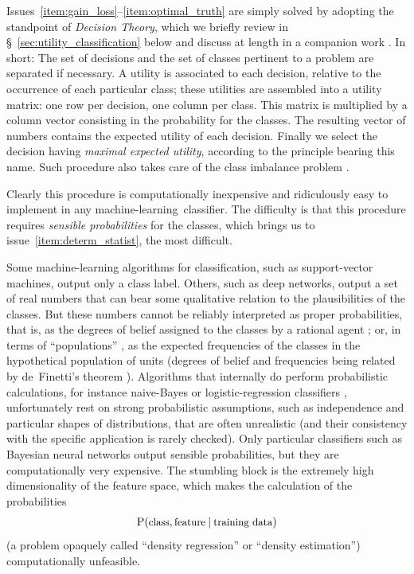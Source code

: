 \documentclass[\ifafour a4paper,12pt,\else a5paper,10pt,\fi%
onecolumn,oneside,article,%
british%
]{memoir}
\theoremstyle{remark}
\theoremstyle{innote}
\renewcommand*{\P}{\mathrm{P}}%
\renewcommand*{\|}[1][]{\nonscript\:#1\vert\nonscript\:\mathopen{}}
\newcommand*{\sect}{\S}%
\newcommand*{\sects}{\S\S}%
\newcommand*{\chap}{ch.}%
\newcommand*{\chaps}{chs}%
\newcommand*{\cf}{{cf.}}
\newcommand*{\texts}[1]{\text{\small #1}}
\newcommand*{\ml}{machine-learning}
\begin{document}
Issues~\ref{item:gain_loss}--\ref{item:optimal_truth} are simply solved by adopting the standpoint of \emph{Decision Theory}, which we briefly review in \sect~\ref{sec:utility_classification} below and discuss at length in a companion work \autocites{dyrlandetal2022}. In short: The set of decisions and the set of classes pertinent to a problem are separated if necessary. A utility is associated to each decision, relative to the occurrence of each particular class; these utilities are assembled into a utility matrix: one row per decision, one column per class. This matrix is multiplied by a column vector consisting in the probability for the classes. The resulting vector of numbers contains the expected utility of each decision. Finally we select the decision having \emph{maximal expected utility}, according to the principle bearing this name. Such procedure also takes care of the class imbalance problem \autocites[\cf\ the analysis by][(they use the term \enquote{cost} instead of \enquote{utility})]{drummondetal2005}.

Clearly this procedure is computationally inexpensive and ridiculously easy to implement in any \ml\ classifier. The difficulty is that this procedure requires \emph{sensible probabilities} \autocites[\enquote*{credibilities  would be agreed by all rational men if there were any rational men}][]{good1966} for the classes, which brings us to issue~\ref{item:determ_statist}, the most difficult.

Some machine-learning algorithms for classification, such as support-vector machines, output only a class label. Others, such as deep networks, output a set of real numbers that can bear some qualitative relation to the plausibilities of the classes. But these numbers cannot be reliably interpreted as proper probabilities, that is, as the degrees of belief assigned to the classes by a rational agent \autocites{mackay1992d,galetal2016}[\chaps~2, 12, 13]{russelletal1995_r2022}; or, in terms of \enquote{populations} \autocites{lindleyetal1981}%
, as the expected frequencies of the classes in the hypothetical population of units (degrees of belief and frequencies being related by de~Finetti's theorem \autocites[\chap~4]{bernardoetal1994_r2000}{dawid2013}). Algorithms that internally do perform probabilistic calculations, for instance naive-Bayes or logistic-regression classifiers \autocites[\sect~3.5, \chap~8]{murphy2012}[\sects~8.2, 4.3]{bishop2006}[\chap~10, \sect~17.4]{barber2007_r2020}, unfortunately rest on strong probabilistic assumptions, such as independence and particular shapes of distributions, that are often unrealistic (and their consistency with the specific application is rarely checked). Only particular classifiers such as Bayesian neural networks \autocites{nealetal2006}[\sect~5.7]{bishop2006} output sensible probabilities, but they are computationally very expensive. The stumbling block is the extremely high dimensionality of the feature space, which makes the calculation of the probabilities
\[
  \P(\texts{class}, \texts{feature} \| \texts{training data})
\]
(a problem opaquely called \enquote{density regression} or \enquote{density estimation}\autocites{ferguson1983,thorburn1986,hjort1996,dunsonetal2007}) computationally unfeasible.
\end{document}
